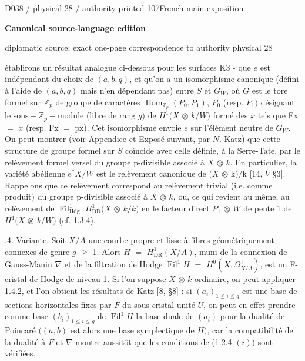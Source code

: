\documentclass[9pt]{article}
\newcommand{\CanonText}[1]{\par{\fontsize{8.0}{9.35}\selectfont\RaggedRight #1\par}\vspace{2.2pt}}
\newcommand{\LayerTitle}{Canonical source-language edition}
\begin{document}
\noindent\begin{minipage}[t][\dimexpr\textheight-5pt\relax][t]{\textwidth}
{\sffamily\fontsize{7.3}{8.2}\selectfont\color{Quiet} D038 / physical 28 / authority printed 107\hfill French main exposition}
\par{}\vspace{4.5pt}
{\sffamily\fontsize{10.4}{11.6}\selectfont\bfseries\color{Accent} \LayerTitle}
\par{\sffamily\fontsize{6.7}{7.7}\selectfont\color{Quiet} diplomatic source; exact one-page correspondence to authority physical 28}
\vspace{5pt}
\CanonText{établirons un résultat analogue ci-dessous pour les surfaces K3 - que \(e\) est indépendant du choix de \((a,b,q)\), et qu'on a un isomorphisme canonique (défini à l'aide de \((a,b,q)\) mais n'en dépendant pas) entre \(S\) et \(G_{W}\), où \(G\) est le tore formel sur \(\mathbb{Z}_{p}\) de groupe de caractères \(\operatorname{Hom}_{\mathbb{Z}_{p}}(P_{0},P_{1})\), \(P_{0}\) (resp. \(P_{1})\) désignant le \(\text{sous}-\mathbb{Z}_{p}-\text{module}\) (libre de rang \(g)\) de \(H^{1}(X\) \(\otimes{}\) \(k/W)\) formé des \(x\) tels que Fx \(=\) \(x\) (resp. Fx \(=\) px). Cet isomorphisme envoie \(e\) sur l'élément neutre de \(G_{W}\). On peut montrer (voir Appendice et Exposé suivant, par \(N\). Katz) que cette structure de groupe formel sur \(S\) coïncide avec celle définie, à la Serre-Tate, par le relèvement formel versel du groupe p-divisible associé à \(X\) \(\otimes{}\) \(k\). En particulier, la variété abélienne \(e^{*}X/W\) est le relèvement canonique de \((X\) \(\otimes{}\) k)/k [14, \(V\) §3]. Rappelons que ce relèvement correspond au relèvement trivial (i.e. comme produit) du groupe p-divisible associé à \(X\) \(\otimes{}\) \(k\), ou, ce qui revient au même, au relèvement de \(\operatorname{Fil}^{1}_{\mathrm{Hdg}}\) \(H^{1}_{\mathrm{DR}}(X\) \(\otimes{}\) \(k/k)\) en le facteur direct \(P_{1}\) \(\otimes{}\) \(W\) de pente 1 de \(H^{1}(X\) \(\otimes{}\) \(k/W)\) (cf. 1.3.4).}
\CanonText{2.1.4. Variante. Soit \(X/A\) une courbe propre et lisse à fibres géométriquement connexes de genre \(g\) \(\geq{}\) 1. Alors \(H\) \(=\) \(H^{1}_{\mathrm{DR}}(X/A)\), muni de la connexion de Gauss-Manin \(\nabla{}\) et de la filtration de Hodge \(\operatorname{Fil}^{1}H\) \(=\) \(H^{0}(X,\Omega{}^{1}_{X/A})\), est un F-cristal de Hodge de niveau 1. Si l'on suppose \(X\) \(\otimes{}\) \(k\) ordinaire, on peut appliquer 1.4.2, et l'on obtient les résultats de Katz [8, §8] : si \((a_{i})_{1\leq{}i\leq{}g}\) est une base de sections horizontales fixes par \(F\) du sous-cristal unité \(U\), on peut en effet prendre comme base \((b_{i})_{1\leq{}i\leq{}g}\) de \(\operatorname{Fil}^{1}H\) la base duale de \((a_{i})\) pour la dualité de Poincaré \(((a,b)\) est alors une base symplectique de \(H)\), car la compatibilité de la dualité à \(F\) et \(\nabla{}\) montre aussitôt que les conditions de (1.2.4 \((i))\) sont vérifiées.}

\end{minipage}
\end{document}
